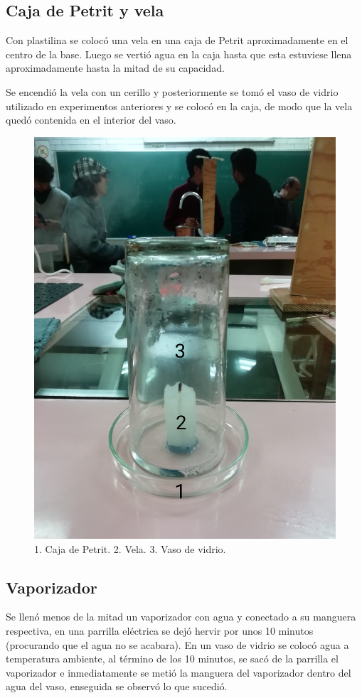 \documentclass[10pt,a4paper]{article}
\begin{document}
\subsection*{Caja de Petrit y vela}
Con plastilina se colocó una vela en una caja de Petrit aproximadamente en el centro de la base. Luego se vertió agua en la caja hasta que esta estuviese llena aproximadamente hasta la mitad de su capacidad.

Se encendió la vela con un cerillo y posteriormente se tomó el vaso de vidrio utilizado en experimentos anteriores y se colocó en la caja, de modo que la vela quedó contenida en el interior del vaso.

\begin{figure}[H]
\includegraphics[scale=0.04]{vela.jpg}
\centering
\caption{1. Caja de Petrit. 2. Vela. 3. Vaso de vidrio.}
\end{figure}

\subsection*{Vaporizador}
Se llenó menos de la mitad un vaporizador con agua y conectado a su manguera respectiva, en una parrilla eléctrica se dejó hervir por unos 10 minutos (procurando que el agua no se acabara). En un vaso de vidrio se colocó agua a temperatura ambiente, al término de los 10 minutos, se sacó de la parrilla el vaporizador e inmediatamente se metió la manguera del vaporizador dentro del agua del vaso, enseguida se observó lo que sucedió.
\end{document}
